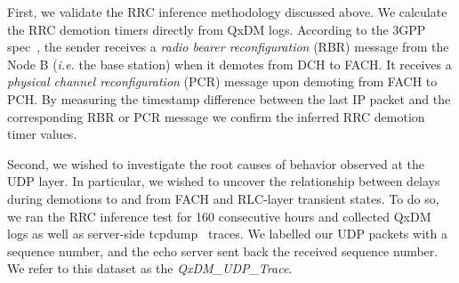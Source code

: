 

First, we validate the RRC inference methodology discussed above. We calculate the RRC demotion timers directly from QxDM logs.  According to the 3GPP spec~\cite{spec-3G-RRC}, the sender receives a \textit{radio bearer reconfiguration} (RBR) message from the Node B (\textit{i.e.} the base station) when it demotes from DCH to FACH.  It receives a  \textit{physical channel reconfiguration} (PCR) message upon demoting from FACH to PCH. By measuring the timestamp difference between the last IP packet and the corresponding RBR or PCR message we confirm the inferred RRC demotion timer values.

Second, we wished to investigate the root causes of behavior observed at the UDP layer.  In particular, we wished to uncover the relationship between delays during demotions to and from FACH and RLC-layer transient states. To do so, we ran the RRC inference test for 160 consecutive hours and collected QxDM logs as well as server-side tcpdump~\cite{tcpdump} traces. We labelled our UDP packets with a sequence number, and the echo server sent back the received sequence number.  We refer to this dataset as the \emph{QxDM\_{}UDP\_{}Trace}.  

